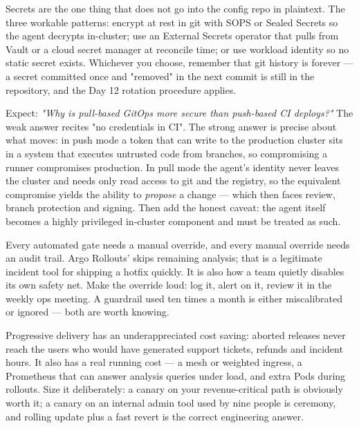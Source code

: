 \begin{secwarn}
Secrets are the one thing that does not go into the config repo in plaintext. The three workable patterns: encrypt at rest in git with SOPS or Sealed Secrets so the agent decrypts in-cluster; use an External Secrets operator that pulls from Vault or a cloud secret manager at reconcile time; or use workload identity so no static secret exists. Whichever you choose, remember that git history is forever --- a secret committed once and "removed" in the next commit is still in the repository, and the Day 12 rotation procedure applies.
\end{secwarn}

\begin{interview}
Expect: \emph{"Why is pull-based GitOps more secure than push-based CI deploys?"} The weak answer recites "no credentials in CI". The strong answer is precise about what moves: in push mode a token that can write to the production cluster sits in a system that executes untrusted code from branches, so compromising a runner compromises production. In pull mode the agent's identity never leaves the cluster and needs only read access to git and the registry, so the equivalent compromise yields the ability to \emph{propose} a change --- which then faces review, branch protection and signing. Then add the honest caveat: the agent itself becomes a highly privileged in-cluster component and must be treated as such.
\end{interview}

\begin{reliability}
Every automated gate needs a manual override, and every manual override needs an audit trail. Argo Rollouts'  skips remaining analysis; that is a legitimate incident tool for shipping a hotfix quickly. It is also how a team quietly disables its own safety net. Make the override loud: log it, alert on it, review it in the weekly ops meeting. A guardrail used ten times a month is either miscalibrated or ignored --- both are worth knowing.
\end{reliability}

\begin{costnote}
Progressive delivery has an underappreciated cost saving: aborted releases never reach the users who would have generated support tickets, refunds and incident hours. It also has a real running cost --- a mesh or weighted ingress, a Prometheus that can answer analysis queries under load, and extra Pods during rollouts. Size it deliberately: a canary on your revenue-critical path is obviously worth it; a canary on an internal admin tool used by nine people is ceremony, and rolling update plus a fast revert is the correct engineering answer.
\end{costnote}

